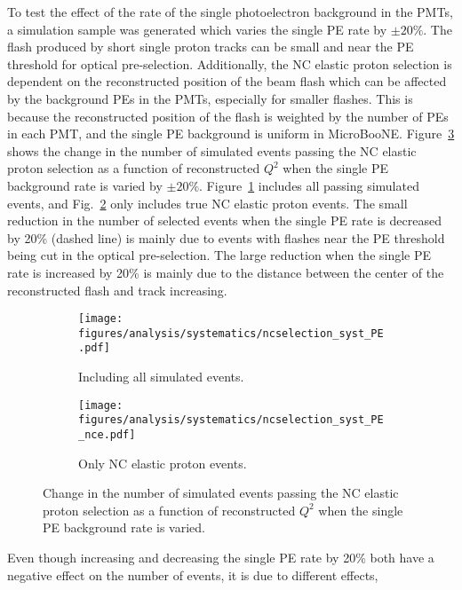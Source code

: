     To test the effect of the rate of the single photoelectron background in
    the PMTs, a simulation sample was generated which varies the single PE rate
    by $\pm 20\%$. The flash produced by short single proton tracks can be
    small and near the PE threshold for optical pre-selection. Additionally,
    the NC elastic proton selection is dependent on the reconstructed position
    of the beam flash which can be affected by the background PEs in the PMTs,
    especially for smaller flashes. This is because the reconstructed position
    of the flash is weighted by the number of PEs in each PMT, and the single
    PE background is uniform in MicroBooNE. Figure~\ref{fig:spechange} shows the
    change in the number of simulated events passing the NC elastic proton
    selection as a function of reconstructed $Q^2$ when the single PE
    background rate is varied by $\pm 20\%$. Figure~\ref{fig:spechangeall}
    includes all passing simulated events, and Fig.~\ref{fig:spechangence} only
    includes true NC elastic proton events. The small reduction in the number
    of selected events when the single PE rate is decreased by 20\% (dashed
    line) is mainly due to events with flashes near the PE threshold being cut
    in the optical pre-selection. The large reduction when the single PE rate
    is increased by 20\% is mainly due to the distance between the center of
    the reconstructed flash and track increasing. 
    \begin{figure}[h]
      \centering
      \begin{subfigure}[t]{2.8in}
        \texttt{[image: figures/analysis/systematics/ncselection\_syst\_PE.pdf]}
        \caption{Including all simulated events.}
        \label{fig:spechangeall}
      \end{subfigure}
      \hspace{2pt}
      \begin{subfigure}[t]{2.8in}
        \texttt{[image: figures/analysis/systematics/ncselection\_syst\_PE\_nce.pdf]}
        \caption{Only NC elastic proton events.}
        \label{fig:spechangence}
      \end{subfigure}
      \caption{Change in the number of simulated events passing the NC elastic
      proton selection as a function of reconstructed $Q^2$ when the single PE
      background rate is varied.}
      \label{fig:spechange}
    \end{figure}
    Even though increasing and decreasing the single PE rate by 20\% both have
    a negative effect on the number of events, it is due to different effects,
